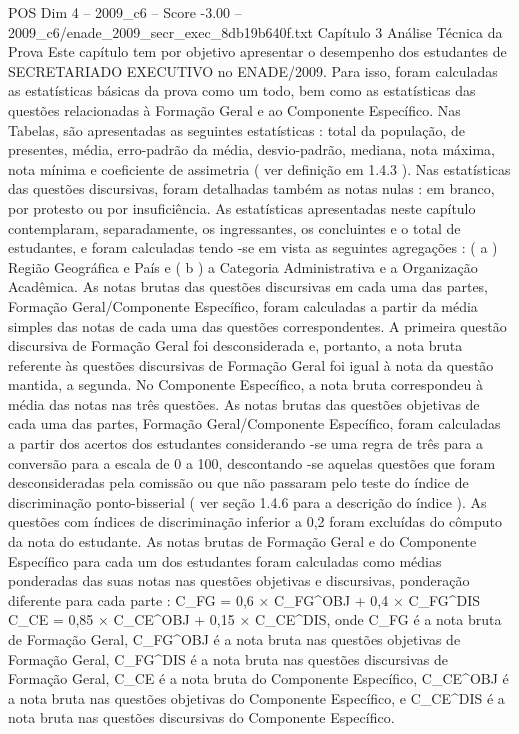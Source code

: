 \begin{textsample}{POS Dim 4 – 2009\_c6 – Score -3.00 – 2009\_c6/enade\_2009\_secr\_exec\_8db19b640f.txt}  \label{ex:f4_pos_325}
Capítulo 3 Análise Técnica da Prova Este capítulo tem por objetivo apresentar o desempenho dos estudantes de SECRETARIADO EXECUTIVO no ENADE/2009.
Para isso, foram calculadas as estatísticas básicas da prova como um todo, bem como as estatísticas das questões relacionadas à Formação Geral e ao Componente Específico.
Nas Tabelas, são apresentadas as seguintes estatísticas : total da população, de presentes, média, erro-padrão da média, desvio-padrão, mediana, nota máxima, nota mínima e coeficiente de assimetria ( ver definição em 1.4.3 ).
Nas estatísticas das questões discursivas, foram detalhadas também as notas nulas : em branco, por protesto ou por insuficiência.
As estatísticas apresentadas neste capítulo contemplaram, separadamente, os ingressantes, os concluintes e o total de estudantes, e foram calculadas tendo -se em vista as seguintes agregações : ( a ) Região Geográfica e País e ( b ) a Categoria Administrativa e a Organização Acadêmica.
As notas brutas das questões discursivas em cada uma das partes, Formação Geral/Componente Específico, foram calculadas a partir da média simples das notas de cada uma das questões correspondentes.
A primeira questão discursiva de Formação Geral foi desconsiderada e, portanto, a nota bruta referente às questões discursivas de Formação Geral foi igual à nota da questão mantida, a segunda.
No Componente Específico, a nota bruta correspondeu à média das notas nas três questões.
As notas brutas das questões objetivas de cada uma das partes, Formação Geral/Componente Específico, foram calculadas a partir dos acertos dos estudantes considerando -se uma regra de três para a conversão para a escala de 0 a 100, descontando -se aquelas questões que foram desconsideradas pela comissão ou que não passaram pelo teste do índice de discriminação ponto-bisserial ( ver seção 1.4.6 para a descrição do índice ).
As questões com índices de discriminação inferior a 0,2 foram excluídas do cômputo da nota do estudante.
As notas brutas de Formação Geral e do Componente Específico para cada um dos estudantes foram calculadas como médias ponderadas das suas notas nas questões objetivas e discursivas, ponderação diferente para cada parte : C\_FG = 0,6 × C\_FG\textasciicircum{}OBJ + 0,4 × C\_FG\textasciicircum{}DIS C\_CE = 0,85 × C\_CE\textasciicircum{}OBJ + 0,15 × C\_CE\textasciicircum{}DIS, onde C\_FG é a nota bruta de Formação Geral, C\_FG\textasciicircum{}OBJ é a nota bruta nas questões objetivas de Formação Geral, C\_FG\textasciicircum{}DIS é a nota bruta nas questões discursivas de Formação Geral, C\_CE é a nota bruta do Componente Específico, C\_CE\textasciicircum{}OBJ é a nota bruta nas questões objetivas do Componente Específico, e C\_CE\textasciicircum{}DIS é a nota bruta nas questões discursivas do Componente Específico.

\end{textsample}
